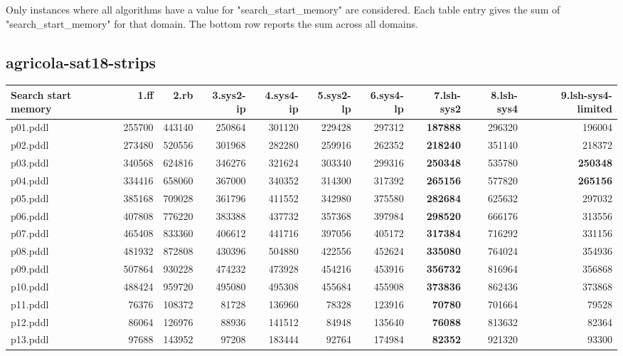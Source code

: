 \documentclass{article}
\begin{document}
Only instances where all algorithms have a value for "search\_start\_memory" are considered. Each table entry gives the sum of "search\_start\_memory" for that domain. The bottom row reports the sum across all domains.

\hypertarget{search_start_memory-agricola-sat18-strips}{}
\subsection*{agricola-sat18-strips}

\begin{tabular}{@{}lrrrrrrrrr@{}}
Search start memory & 1.ff & 2.rb & 3.sys2-ip & 4.sys4-ip & 5.sys2-lp & 6.sys4-lp & 7.lsh-sys2 & 8.lsh-sys4 & 9.lsh-sys4-limited \\
\midrule
p01.pddl & 255700 & 443140 & 250864 & 301120 & 229428 & 297312 & \textbf{187888} & 296320 & 196004 \\
p02.pddl & 273480 & 520556 & 301968 & 282280 & 259916 & 262352 & \textbf{218240} & 351140 & 218372 \\
p03.pddl & 340568 & 624816 & 346276 & 321624 & 303340 & 299316 & \textbf{250348} & 535780 & \textbf{250348} \\
p04.pddl & 334416 & 658060 & 367000 & 340352 & 314300 & 317392 & \textbf{265156} & 577820 & \textbf{265156} \\
p05.pddl & 385168 & 709028 & 361796 & 411552 & 342980 & 375580 & \textbf{282684} & 625632 & 297032 \\
p06.pddl & 407808 & 776220 & 383388 & 437732 & 357368 & 397984 & \textbf{298520} & 666176 & 313556 \\
p07.pddl & 465408 & 833360 & 406612 & 441716 & 397056 & 405172 & \textbf{317384} & 716292 & 331156 \\
p08.pddl & 481932 & 872808 & 430396 & 504880 & 422556 & 452624 & \textbf{335080} & 764024 & 354936 \\
p09.pddl & 507864 & 930228 & 474232 & 473928 & 454216 & 453916 & \textbf{356732} & 816964 & 356868 \\
p10.pddl & 488424 & 959720 & 495080 & 495308 & 455684 & 455908 & \textbf{373836} & 862436 & 373868 \\
p11.pddl & 76376 & 108372 & 81728 & 136960 & 78328 & 123916 & \textbf{70780} & 701664 & 79528 \\
p12.pddl & 86064 & 126976 & 88936 & 141512 & 84948 & 135640 & \textbf{76088} & 813632 & 82364 \\
p13.pddl & 97688 & 143952 & 97208 & 183444 & 92764 & 174984 & \textbf{82352} & 921320 & 93300 \\

\end{tabular}
\end{document}
